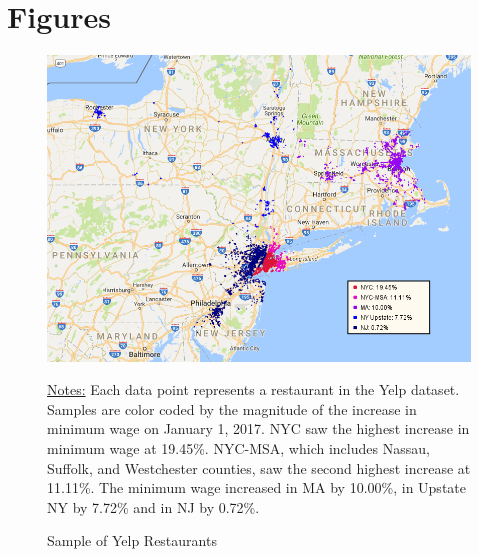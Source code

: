\documentclass[11pt]{article}
\begin{document}
\newpage


% 


\newpage


\section{Figures}

\vspace{20mm}

\begin{figure}[H]
\centering
\caption{Sample of Yelp Restaurants}
\includegraphics[width=6in]{full_yelp_map.png}

{\footnotesize \raggedright \underline{Notes:} Each data point represents a restaurant in the Yelp dataset. Samples are color coded by the magnitude of the increase in minimum wage on January 1, 2017. NYC saw the highest increase in minimum wage at 19.45\%. NYC-MSA, which includes Nassau, Suffolk, and Westchester counties, saw the second highest increase at 11.11\%. The minimum wage increased in MA by 10.00\%, in Upstate NY by 7.72\% and in NJ by 0.72\%. \par}
\end{figure}

\newpage

\vspace{20mm}
\end{document}

